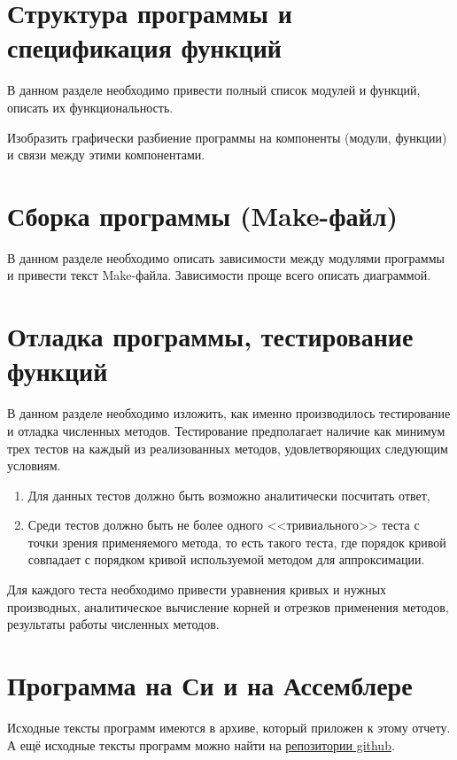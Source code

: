 \documentclass[a4paper,12pt,titlepage,finall]{article}
\begin{document}
\newpage

\section{Структура программы и спецификация функций}

В данном разделе необходимо привести полный список модулей и функций,
описать их функциональность.

Изобразить графически разбиение программы на компоненты (модули, функции)
и связи между этими компонентами.

\newpage

\section{Сборка программы (Make-файл)}

В данном разделе необходимо описать зависимости между модулями программы
и привести текст Make-файла. Зависимости проще всего описать диаграммой.

\newpage

\section{Отладка программы, тестирование функций}

В данном разделе необходимо изложить, как именно производилось тестирование
и отладка численных методов. Тестирование предполагает наличие как минимум
трех тестов на каждый из реализованных методов, удовлетворяющих следующим
условиям.
\begin{enumerate}
\item Для данных тестов должно быть возможно аналитически посчитать ответ,
\item Среди тестов должно быть не более одного <<тривиального>> теста
    с точки зрения применяемого метода, то есть такого теста, где порядок
    кривой совпадает с порядком кривой используемой методом для аппроксимации.
\end{enumerate}

Для каждого теста необходимо привести уравнения кривых и нужных производных,
аналитическое вычисление корней и отрезков применения методов, результаты
работы численных методов.

\newpage

\section{Программа на Си и на Ассемблере}
Исходные тексты программ имеются в архиве, который приложен к этому отчету. 
А ещё исходные тексты программ можно найти на \href{https://github.com/SadWork/msu_task02}{репозитории github}.
\newpage
\end{document}
